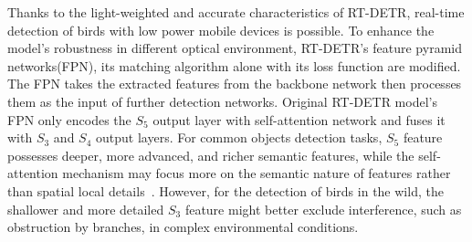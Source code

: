 Thanks to the light-weighted and accurate characteristics of RT-DETR, 
real-time detection of birds with low power mobile devices is possible. 
To enhance the model's robustness in different optical environment, 
RT-DETR's feature pyramid networks(FPN), its matching algorithm alone with its loss function
are modified. The FPN takes the extracted features from the backbone network then processes them 
as the input of further detection networks.
Original RT-DETR model's FPN only encodes the $S_5$ output layer
with self-attention network and fuses it with $S_3$ and $S_4$ output layers.
For common objects detection tasks, $S_5$ 
feature possesses deeper, more advanced, and richer semantic features, while the self-attention mechanism may focus more on the semantic nature of features rather than spatial local details~\cite{RTDETR}.
However, for the detection of birds in the wild, the shallower and more detailed $S_3$ feature might better exclude interference, such as obstruction by branches, in complex environmental conditions.
